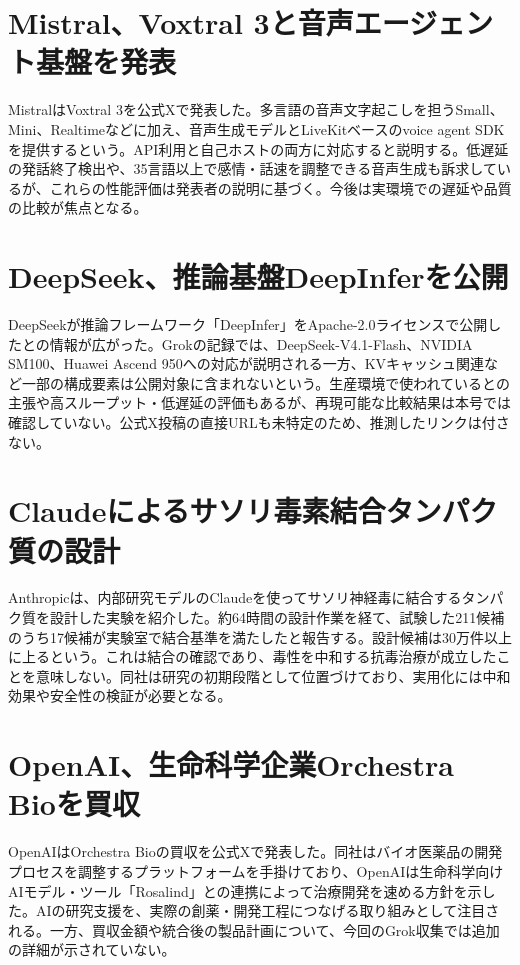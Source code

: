 \section{Mistral、Voxtral 3と音声エージェント基盤を発表}
MistralはVoxtral 3を公式Xで発表した。多言語の音声文字起こしを担うSmall、Mini、Realtimeなどに加え、音声生成モデルとLiveKitベースのvoice agent SDKを提供するという。API利用と自己ホストの両方に対応すると説明する。低遅延の発話終了検出や、35言語以上で感情・話速を調整できる音声生成も訴求しているが、これらの性能評価は発表者の説明に基づく。今後は実環境での遅延や品質の比較が焦点となる。

\section{DeepSeek、推論基盤DeepInferを公開}
DeepSeekが推論フレームワーク「DeepInfer」をApache-2.0ライセンスで公開したとの情報が広がった。Grokの記録では、DeepSeek-V4.1-Flash、NVIDIA SM100、Huawei Ascend 950への対応が説明される一方、KVキャッシュ関連など一部の構成要素は公開対象に含まれないという。生産環境で使われているとの主張や高スループット・低遅延の評価もあるが、再現可能な比較結果は本号では確認していない。公式X投稿の直接URLも未特定のため、推測したリンクは付さない。

\section{Claudeによるサソリ毒素結合タンパク質の設計}
Anthropicは、内部研究モデルのClaudeを使ってサソリ神経毒に結合するタンパク質を設計した実験を紹介した。約64時間の設計作業を経て、試験した211候補のうち17候補が実験室で結合基準を満たしたと報告する。設計候補は30万件以上に上るという。これは結合の確認であり、毒性を中和する抗毒治療が成立したことを意味しない。同社は研究の初期段階として位置づけており、実用化には中和効果や安全性の検証が必要となる。

\section{OpenAI、生命科学企業Orchestra Bioを買収}
OpenAIはOrchestra Bioの買収を公式Xで発表した。同社はバイオ医薬品の開発プロセスを調整するプラットフォームを手掛けており、OpenAIは生命科学向けAIモデル・ツール「Rosalind」との連携によって治療開発を速める方針を示した。AIの研究支援を、実際の創薬・開発工程につなげる取り組みとして注目される。一方、買収金額や統合後の製品計画について、今回のGrok収集では追加の詳細が示されていない。

